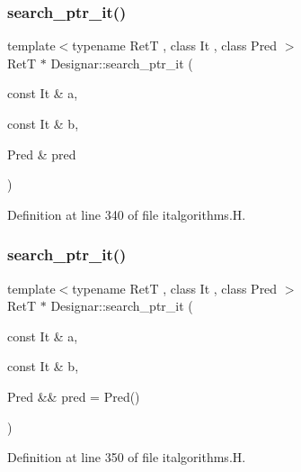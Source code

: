 \mbox{\label{namespace_designar_aaf2247479f4e93c88a4f6dd39267de5d}} 
\subsubsection{\texorpdfstring{search\+\_\+ptr\+\_\+it()}{search\_ptr\_it()}\hspace{0.1cm}{\footnotesize\ttfamily [1/2]}}
{\footnotesize\ttfamily template$<$typename RetT , class It , class Pred $>$ \\
RetT $\ast$ Designar\+::search\+\_\+ptr\+\_\+it (\begin{DoxyParamCaption}\item[{const It \&}]{a,  }\item[{const It \&}]{b,  }\item[{Pred \&}]{pred }\end{DoxyParamCaption})}



Definition at line 340 of file italgorithms.\+H.

\mbox{\label{namespace_designar_a6147a7cb2455406a69047efb700e5d50}} 
\subsubsection{\texorpdfstring{search\+\_\+ptr\+\_\+it()}{search\_ptr\_it()}\hspace{0.1cm}{\footnotesize\ttfamily [2/2]}}
{\footnotesize\ttfamily template$<$typename RetT , class It , class Pred $>$ \\
RetT $\ast$ Designar\+::search\+\_\+ptr\+\_\+it (\begin{DoxyParamCaption}\item[{const It \&}]{a,  }\item[{const It \&}]{b,  }\item[{Pred \&\&}]{pred = {\ttfamily Pred()} }\end{DoxyParamCaption})}



Definition at line 350 of file italgorithms.\+H.

\mbox{\label{namespace_designar_ac3674dae50d8d382e25a5fce8775294c}} 
